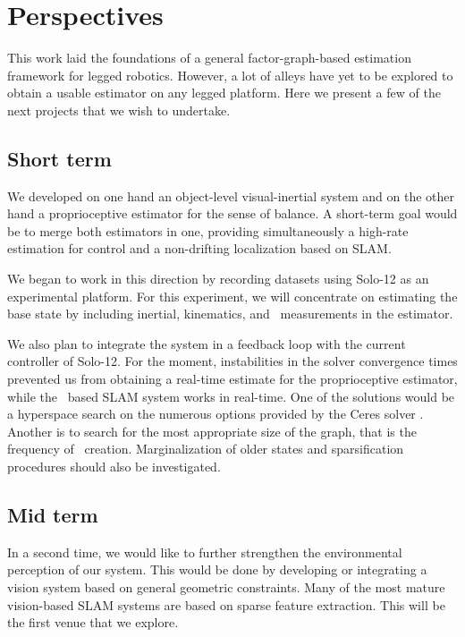 \section{Perspectives}
This work laid the foundations of a general factor-graph-based estimation framework for legged robotics. However, a lot of alleys have yet to be explored 
to obtain a usable estimator on any legged platform. Here we present a few of the next projects that we wish to undertake.

\subsection{Short term}
We developed on one hand an object-level visual-inertial system and on the other hand a proprioceptive estimator for the sense of balance. A short-term goal
would be to merge both estimators in one, providing simultaneously a high-rate estimation for control and a non-drifting localization based on SLAM. 

We began to work in this direction by recording datasets using Solo-12 as an experimental platform. For this experiment, we will concentrate on estimating the 
base state by including inertial, kinematics, and \apriltag\ measurements in the estimator. 

We also plan to integrate the system in a feedback loop with the current controller of Solo-12. For the moment, instabilities in the solver convergence times prevented
us from obtaining a real-time estimate for the proprioceptive estimator, while the \apriltag\ based SLAM system works in real-time. One of the solutions would 
be a hyperspace search on the numerous options provided by the Ceres solver \cite{ceres-solver}. Another is to search for the most appropriate size of the graph,
that is the frequency of \keyframe\ creation. Marginalization of older states and sparsification procedures should also be investigated.



\subsection{Mid term}

In a second time, we would like to further strengthen the environmental perception of our system. This would be done by developing or integrating a vision system
based on general geometric constraints. Many of the most mature vision-based SLAM systems are based on sparse feature extraction. This will be 
the first venue that we explore. 

